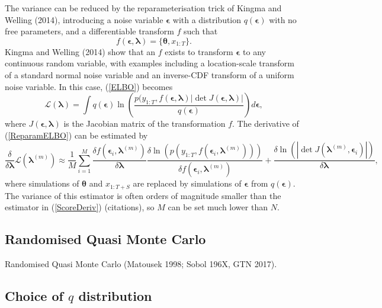 \documentclass[12pt,a4paper]{article}%
\numberwithin{equation}{section}
\begin{document}
The variance can be reduced by the reparameterisation trick of Kingma and Welling (2014), introducing a noise variable $\boldsymbol{\epsilon}$ with a distribution $q(\boldsymbol{\epsilon})$ with no free parameters, and a differentiable transform $f$ such that
\begin{equation}
\label{Reparam}
f(\boldsymbol{\epsilon}, \boldsymbol{\lambda}) = \{\boldsymbol{\theta}, x_{1:T}\}.
\end{equation}
Kingma and Welling (2014) show that an $f$ exists to transform $\boldsymbol{\epsilon}$ to any continuous random variable, with examples including a location-scale transform of a standard normal noise variable and an inverse-CDF transform of a uniform noise variable. In this case, (\ref{ELBO}) becomes
\begin{equation}
\label{ReparamELBO}
\mathcal{L}(\boldsymbol{\lambda}) = \int q(\boldsymbol{\epsilon}) \ln \left( \frac{p(y_{1:T},f(\boldsymbol{\epsilon}, \boldsymbol{\lambda}) |\det J(\boldsymbol{\epsilon}, \boldsymbol{\lambda})|}{q(\boldsymbol{\epsilon})} \right) d\boldsymbol{\epsilon},
\end{equation}
where $J(\boldsymbol{\epsilon}, \boldsymbol{\lambda})$ is the Jacobian matrix of the transformation $f$. The derivative of (\ref{ReparamELBO}) can be estimated by 
\begin{equation}
\label{ReparamDeriv}
\frac{\delta}{\delta \boldsymbol{\lambda}}\mathcal{L}(\boldsymbol{\lambda}^{(m)}) \approx \frac{1}{M}\sum_{i=1}^{M}
\frac{\delta f(\boldsymbol{\epsilon}_i, \boldsymbol{\lambda}^{(m)})} {\delta \boldsymbol{\lambda}}
\frac{\delta \ln (p(y_{1:T}, f(\boldsymbol{\epsilon}_i, \boldsymbol{\lambda}^{(m)})))}{\delta f(\boldsymbol{\epsilon}_i, \boldsymbol{\lambda}^{(m)})} + \frac{\delta  \ln(|\det J(\boldsymbol{\lambda}^{(m)}, \boldsymbol{\epsilon}_i)|)}{\delta \boldsymbol{\lambda}},
\end{equation} 
where simulations of $\boldsymbol{\theta}$ and $x_{1:T+S}$ are replaced by simulations of $\boldsymbol{\epsilon}$ from $q(\boldsymbol{\epsilon})$. The variance of this estimator is often orders of magnitude smaller than the estimator in (\ref{ScoreDeriv}) (citations), so $M$ can be set much lower than $N$.

\subsection{Randomised Quasi Monte Carlo}
Randomised Quasi Monte Carlo (Matousek 1998; Sobol 196X, GTN 2017).

\subsection{Choice of $q$ distribution}
\end{document}
